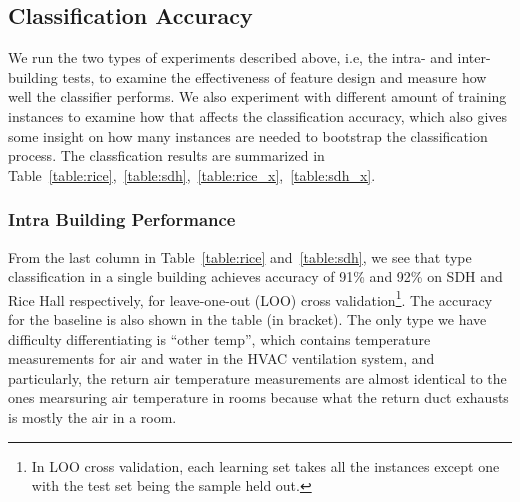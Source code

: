 \subsection{Classification Accuracy}
We run the two types of experiments described above, i.e, the intra- and inter- building tests, to examine the effectiveness of feature design and measure how well 
the classifier performs. We also experiment with different amount of training instances to examine how that affects the classification accuracy, which also gives 
some insight on how many instances are needed to bootstrap the classification process. The classfication results are summarized in Table~\ref{table:rice},~\ref{table:sdh},~\ref{table:rice_x},~\ref{table:sdh_x}.

\subsubsection{Intra Building Performance}
From the last column in Table~\ref{table:rice} and~\ref{table:sdh}, we see that type classification in a single building achieves accuracy of 91\% and 92\% on SDH and Rice Hall respectively, for leave-one-out (LOO) cross validation\footnote{In LOO cross validation, each learning set takes all the instances except one with the test set being the sample held out.}. The accuracy for the baseline is also shown in the table (in bracket). The only type we have difficulty differentiating is ``other temp'', which contains temperature measurements for air and water in the HVAC ventilation system, and particularly, the return air temperature measurements are almost identical to the ones mearsuring air temperature in rooms because what the return duct exhausts is mostly the air in a room.

